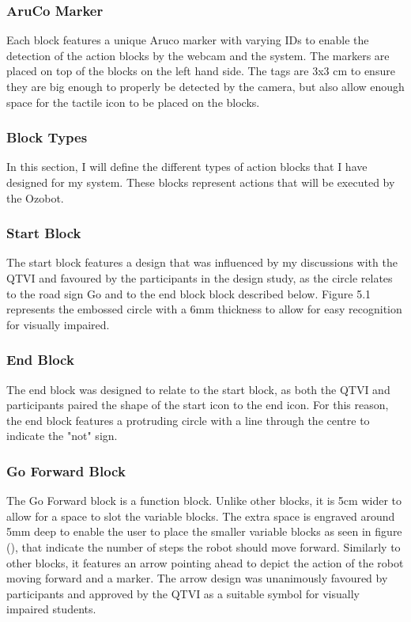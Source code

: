 \documentclass[oneside,%
                    author={Malak Hajji},
                    degree={BSc},
                    title={Designing An Accessible Computational Toolkit For Students},
                  subtitle={With Mixed Visual Abilities}]{dissertation}
\begin{document}
\subsubsection{AruCo Marker}
Each block features a unique Aruco marker with varying IDs to enable the detection of the action blocks by the webcam and the system. The markers are placed on top of the blocks on the left hand side. The tags are 3x3 cm to ensure they are big enough to properly be detected by the camera, but also allow enough space for the tactile icon to be placed on the blocks.
\subsubsection{Block Types}
In this section, I will define the different types of action blocks that I have designed for my system. These blocks represent actions that will be executed by the Ozobot.
\subsubsection{Start Block}
The start block features a design that was influenced by my discussions with the QTVI and favoured by the participants in the design study, as the circle relates to the road sign Go and to the end block block described below. Figure 5.1 represents the embossed circle with a 6mm thickness to allow for easy recognition for visually impaired. 

\subsubsection{End Block}
The end block was designed to relate to the start block, as both the QTVI and participants paired the shape of the start icon to the end icon. For this reason, the end block features a protruding circle with a line through the centre to indicate the "not" sign.

\subsubsection{Go Forward Block}
The Go Forward block is a function block. Unlike other blocks, it is 5cm wider to allow for a space to slot the variable blocks. The extra space is engraved around 5mm deep to enable the user to place the smaller variable blocks as seen in figure (), that indicate the number of steps the robot should move forward. Similarly to other blocks, it features an arrow pointing ahead to depict the action of the robot moving forward and a marker. The arrow design was unanimously favoured by participants and approved by the QTVI as a suitable symbol for visually impaired students. 
\end{document}
